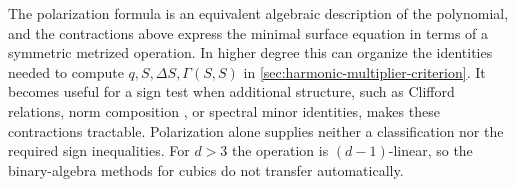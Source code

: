 The polarization formula is an equivalent algebraic description of
the polynomial, and the contractions above express the minimal surface
equation in terms of a symmetric metrized operation. In higher degree
this can organize the identities needed to compute
$q,S,\Delta S,\Gamma(S,S)$ in
\cref{sec:harmonic-multiplier-criterion}. It becomes useful for a sign
test when additional structure, such as Clifford relations, norm
composition \cite[Chapter~1, Appendix, pp.~21--22]{Shapiro2000}, or
spectral minor identities, makes these contractions tractable.
Polarization alone supplies neither a classification nor the required
sign inequalities. For $d>3$ the operation is $(d-1)$-linear, so the
binary-algebra methods for cubics do not transfer automatically.
